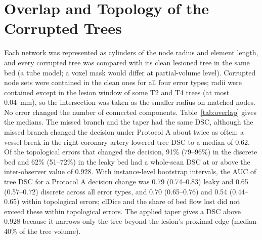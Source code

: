 \documentclass[journal,twoside,web,onecolumn]{ieeecolor}
\begin{document}
\FloatBarrier
\section{Overlap and Topology of the Corrupted Trees}\label{sec:overlap}
Each network was represented as cylinders of the node radius and element length, and every corrupted tree was
compared with its clean lesioned tree in the same bed (a tube model; a voxel mask would differ at partial-volume
level). Corrupted node sets were contained in the clean ones for all four error types; radii were contained except in
the lesion window of some T2 and T4 trees (at most 0.04~mm), so the intersection was taken as the smaller radius on
matched nodes. No error changed the number of connected components. Table~\ref{tab:overlap} gives the medians. The
missed branch and the taper had the same DSC, although the missed branch changed the decision under Protocol A about
twice as often; a vessel break in the right coronary artery lowered tree DSC to a median of 0.62. Of the topological
errors that changed the decision, 91\% (79--96\%) in the discrete bed and 62\% (51--72\%) in the leaky bed had a
whole-scan DSC at or above the inter-observer value of 0.928. With instance-level bootstrap intervals, the AUC of tree
DSC for a Protocol A decision change was 0.79 (0.74--0.83) leaky and 0.65 (0.57--0.72) discrete across all error
types, and 0.70 (0.65--0.76) and 0.54 (0.44--0.65) within topological errors; clDice and the share of bed flow lost did
not exceed these within topological errors. The applied taper gives a DSC above 0.928 because it narrows only the
tree beyond the lesion's proximal edge (median 40\% of the tree volume).
\end{document}
